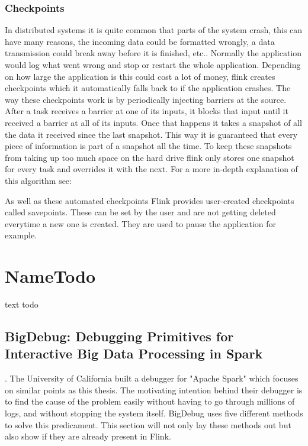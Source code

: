 \subsubsection{Checkpoints}
\label{checkpoints}

In distributed systems it is quite common that parts of the system crash, this can have many reasons, the incoming data could be formatted wrongly, a data transmission could break away before it is finished, etc.. Normally the application would log what went wrong and stop or restart the whole application. Depending on how large the application is this could cost a lot of money, flink creates checkpoints which it automatically falls back to if the application crashes. The way these checkpoints work is by periodically injecting barriers at the source. After a task receives a barrier at one of its inputs, it blocks that input until it received a barrier at all of its inputs. Once that happens it takes a snapshot of all the data it received since the last snapshot. This way it is guaranteed that every piece of information is part of a snapshot all the time. To keep these snapshots from taking up too much space on the hard drive flink only stores one snapshot for every task and overrides it with the next. For a more in-depth explanation of this algorithm see: \cite{DBLP:journals/corr/CarboneFEHT15}

As well as these automated checkpoints Flink provides user-created checkpoints called savepoints. These can be set by the user and are not getting deleted everytime a new one is created. They are used to pause the application for example.


\section{NameTodo}
\label{todo}

text todo

\subsection{BigDebug: Debugging Primitives for Interactive Big Data Processing in Spark}

\cite{Gulzar:2016:BDP:2884781.2884813}. The University of California built a debugger for "Apache Spark" which focuses on similar points as this thesis. The motivating intention behind their debugger is to find the cause of the problem easily without having to go through millions of logs, and without stopping the system itself. BigDebug uses five different methods to solve this predicament. This section will not only lay these methods out but also show if they are already present in Flink.

